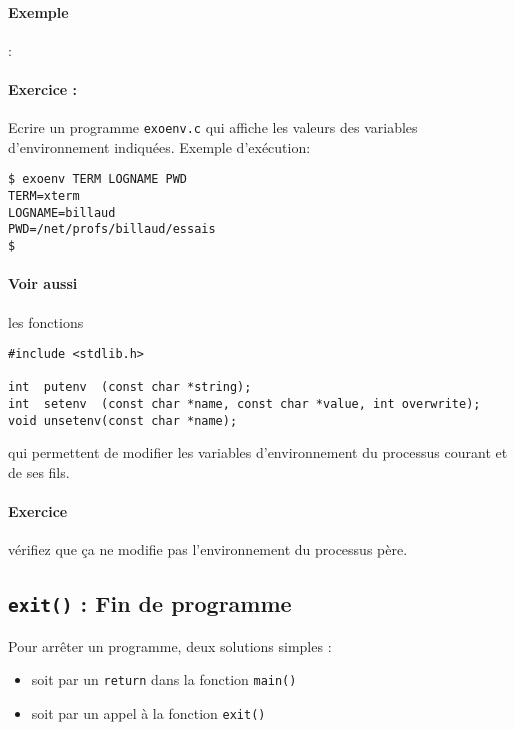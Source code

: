\paragraph*{Exemple} :

\source




\paragraph*{Exercice : } Ecrire un programme \texttt{exoenv.c} qui affiche les 
valeurs des variables d'environnement indiquées.
Exemple d'exécution:

\extrait
\begin{lstlisting}
$ exoenv TERM LOGNAME PWD
TERM=xterm
LOGNAME=billaud
PWD=/net/profs/billaud/essais
$
\end{lstlisting}

\paragraph*{Voir aussi} les fonctions 





\extrait
\begin{lstlisting}
#include <stdlib.h>
  
int  putenv  (const char *string);
int  setenv  (const char *name, const char *value, int overwrite);
void unsetenv(const char *name);
\end{lstlisting}

qui permettent de modifier les variables d'environnement
du processus courant et de ses fils.

\paragraph*{Exercice} vérifiez que ça ne modifie pas l'environnement
du processus père.

\subsection{\texttt{exit()} : Fin de programme}

Pour arrêter un programme, deux solutions simples :
\begin{itemize}
\item soit par un \texttt{return} dans la fonction \texttt{main()}
\item soit par un appel à la fonction \texttt{exit()}
\end{itemize}


